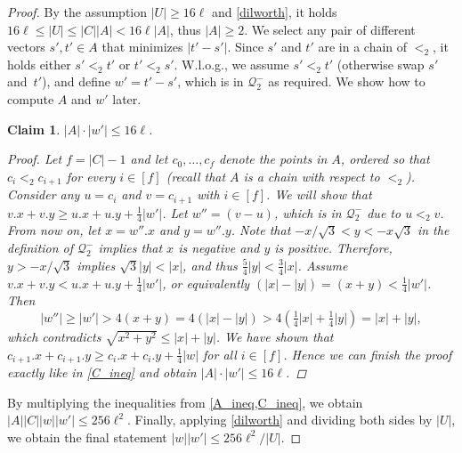 \documentclass[twoside,leqno]{article}
\let\Cref\cref
\newtheorem{claim}{Claim}[section]
\newcommand{\Q}{\mathcal{Q}}
\newcommand{\absolute}[1]{\left\lvert#1\right\rvert}
\begin{document}
\begin{proof}
By the assumption $\absolute{U} \ge 16\ell$ and \Cref{dilworth}, it holds
$16 \ell \le \absolute{U} \le \absolute{C} \absolute{A} < 16\ell\absolute{A}$,
thus $\absolute{A} \ge 2$.
We select any pair of different vectors $s', t' \in A$ that minimizes $\absolute{t' - s'}$. Since $s'$ and $t'$ are in a chain of $<_2$, it holds either $s' <_2 t'$ or $t' <_2 s'$. W.l.o.g., we assume $s' <_2 t'$ (otherwise swap $s'$ and~$t'$), and define $w' = t' - s'$, which is in $\Q_2^-$ as required.  We show how to compute $A$ and $w'$ later.

\begin{claim}\label{A_ineq}
	$\absolute{A}\cdot \absolute{w'} \leq 16\ell$. 
	\begin{proof}
	
		Let $f = \absolute{C} - 1$ and
		let $c_0, \dots, c_{f}$ denote the points in $A$, ordered so that $c_i <_2 c_{i + 1}$ for every $i \in [f]$ (recall that $A$ is a chain with respect to $<_2$).
		Consider any $u = c_i$ and $v = c_{i + 1}$ with $i \in [f]$. We will show that $v.x + v.y \geq u.x + u.y + \frac14\absolute{w'}$. 		
		Let $w'' = (v - u)$, which is in $\Q_2^-$ due to $u <_2 v$. From now on, let $x = w''.x$ and $y = w''.y$. 
		Note that $-x/\sqrt{3} < y < -x \sqrt{3}$ in the definition of $\Q_2^-$ implies that $x$ is negative and $y$ is positive.
		Therefore, $y > -x/\sqrt{3}$ implies $\sqrt{3}\absolute{y} < \absolute{x}$, and thus $\frac 5 4\absolute{y} < \frac 3 4\absolute{x}$.
		Assume $v.x + v.y < u.x + u.y + \frac14\absolute{w'}$, or equivalently $(\absolute{x} - \absolute{y}) = (x + y) < \frac14\absolute{w'}$. Then $$\absolute{w''} \geq \absolute{w'} > 4(x + y) = 4(\absolute{x} - \absolute{y}) > 4(\tfrac14\absolute{x} + \tfrac14\absolute{y}) = 
		\absolute{x} + \absolute{y},$$
		which contradicts $\sqrt{x^2 + y^2} \leq \absolute{x} + \absolute{y}$. We have shown that $c_{i + 1}.x + c_{i + 1}.y \geq c_i.x + c_i.y + \frac14\absolute{w}$ for all $i \in [f]$. Hence we can finish the proof exactly like in \cref{C_ineq} and obtain $\absolute{A}\cdot \absolute{w'} \leq 16\ell$.
	\end{proof}
\end{claim}

By multiplying the inequalities from \cref{A_ineq,C_ineq}, we obtain $\absolute{A}\absolute{C}\absolute{w}\absolute{w'} \leq 256\ell^2$. Finally, applying \cref{dilworth} and dividing both sides by $\absolute{U}$, we obtain the final statement $\absolute{w}\absolute{w'} \leq 256\ell^2/\absolute{U}$.


\end{proof}
\end{document}
